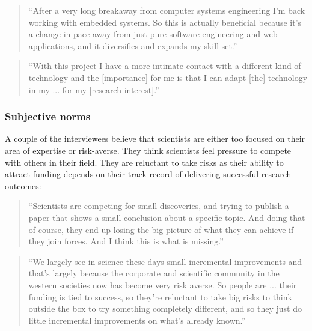 \begin{quote}
\small
\enquote{After a very long breakaway from computer systems engineering I'm back working with embedded systems. So this is actually beneficial because it's a change in pace away from just pure software engineering and web applications, and it diversifies and expands my skill-set.} \\
\end{quote}

\begin{quote}
\small
\enquote{With this project I have a more intimate contact with a different kind of technology and the [importance] for me is that I can adapt [the] technology in my ... for my [research interest].} \\
\end{quote}

\subsubsection{Subjective norms}

A couple of the interviewees believe that scientists are either too focused on their area of expertise or risk-averse. They think scientists feel pressure to compete with others in their field. They are reluctant to take risks as their ability to attract funding depends on their track record of delivering successful research outcomes:

\begin{quote}
\small
\enquote{Scientists are competing for small discoveries, and trying to publish a paper that shows a small conclusion about a specific topic. And doing that of course, they end up losing the big picture of what they can achieve if they join forces. And I think this is what is missing.} \\
\end{quote}

\begin{quote}
\small
\enquote{We largely see in science these days small incremental improvements and that's largely because the corporate and scientific community in the western societies now has become very risk averse. So people are ... their funding is tied to success, so they're reluctant to take big risks to think outside the box to try something completely different, and so they just do little incremental improvements on what's already known.} \\
\end{quote}

